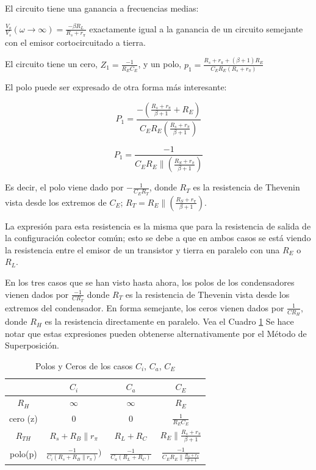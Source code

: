 El circuito tiene una ganancia a frecuencias medias:

\( \frac{V_o}{V_s} (\omega \to \infty) = \frac{-\beta R_L}{R_s + r_{\pi}} \) exactamente igual a la ganancia de un circuito semejante con el emisor cortocircuitado a tierra.

El circuito tiene un cero, \( Z_1 = \frac{-1}{R_E C_E} \), y un polo, \( p_1 = \frac{R_s + r_{\pi} + (\beta+1)R_E}{C_E R_E (R_s + r_{\pi})} \)

El polo puede ser expresado de otra forma más interesante:

\[
P_1 = \frac{-(\frac{R_s+r_{\pi}}{\beta+1}+R_E)}{C_E R_E (\frac{R_s + r_\pi}{\beta+1})}			
\]

\[
P_1 =  \frac{-1}{C_E R_E \parallel (\frac{R_S+r_{\pi}}{\beta+1})}
\]

Es decir, el polo viene dado por \( -\frac{1}{C_E R_T} \), donde \( R_T \) es la resistencia de Thevenin vista desde los extremos de \(C_E\); \(R_T = R_E \parallel (\frac{R_S+r_{\pi}}{\beta+1}) \).

La expresión para esta resistencia es la misma que para la resistencia de salida de la configuración colector común; esto se debe a que en ambos casos se está viendo la resistencia entre el emisor de un transistor y tierra en paralelo con una \( R_E \) o \( R_L \).

En los tres casos que se han visto hasta ahora, los polos de los condensadores vienen dados por \( \frac{-1}{C R_T} \) donde \( R_T \) es la resistencia de Thevenin vista desde los extremos del condensador. En forma semejante, los ceros vienen dados por \( \frac{1}{C R_H} \), donde $R_H$ es la resistencia directamente en paralelo. Vea el Cuadro \ref{tab:respfreq_polos-ceros} Se hace notar que estas expresiones pueden obtenerse alternativamente por el Método de Superposición.

\begin{table}[h]
	\centering
	\begin{tabular}{|c|c|c|c|}
		\hline
		& $C_i$ & $C_a$ & $C_E$ \\ \hline
		$R_H$ & $\infty$ & $\infty$ & $R_E$ \\ \hline
		cero (z) & 0 & 0 & $\frac{1}{R_E C_E}$ \\ \hline
		$R_{TH}$ & $R_s + R_B \parallel r_{\pi}$ & $R_L + R_C$ & $R_E \parallel \frac{R_s + r_{\pi}}{\beta + 1} $ \\ \hline
		polo(p) & $\frac{-1}{C_i (R_s + R_B \parallel r_{\pi})} )$ & $ \frac{-1}{C_a (R_L + R_C)}$ & $\frac{-1}{C_E R_E \parallel \frac{R_s + r_{\pi}}{\beta+1}}$ \\ \hline
	\end{tabular}
	\caption{Polos y Ceros de los casos \(C_i\), \(C_a\), \(C_E\)}
	\label{tab:respfreq_polos-ceros}
\end{table}


